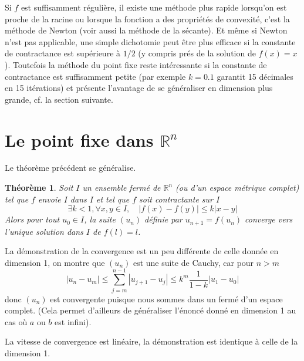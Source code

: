 \documentclass[a4paper,11pt]{book}
\newtheorem{thm}{Théorème}
\begin{document}
\begin{giacjshere}
Si $f$ est suffisamment r\'eguli\`ere,
il existe une méthode plus rapide lorsqu'on est proche de la racine ou lorsque
la fonction a des propriétés de convexité, c'est la méthode de Newton
(voir aussi la m\'ethode de la s\'ecante).
Et m\^eme si Newton n'est pas applicable, une simple dichotomie
peut \^etre plus efficace si la constante de contractance est 
sup\'erieure \`a $1/2$ (y compris pr\'es de la solution de $f(x)=x$).
Toutefois la m\'ethode du point fixe reste int\'eressante si la
constante de contractance est suffisamment petite (par exemple $k=0.1$
garantit 15 d\'ecimales en 15 it\'erations) et pr\'esente l'avantage
de se g\'en\'eraliser en dimension plus grande, cf. la section suivante.

\section{Le point fixe dans $\mathbb{R}^n$}
Le th\'eor\`eme pr\'ec\'edent se g\'en\'eralise. 
\begin{thm}
Soit $I$ un ensemble
ferm\'e de $\mathbb{R}^n$ (ou d'un espace m\'etrique complet) tel que $f$ 
envoie $I$ dans $I$ et tel que $f$ soit contractante sur $I$
$$ \exists k<1, \forall x,y \in I, \quad |f(x)-f(y)| \leq k |x-y|$$
Alors pour tout $u_0 \in I$, la suite $(u_n)$ d\'efinie par
$u_{n+1}=f(u_n)$ converge vers l'unique solution dans $I$ de $f(l)=l$.
\end{thm}
La d\'emonstration de la convergence est un peu diff\'erente de celle 
donn\'ee en
dimension 1, on montre que $(u_n)$ est une suite de Cauchy, car pour $n>m$
$$ |u_n-u_m| \leq \sum_{j=m}^{n-1}|u_{j+1}-u_j | 
\leq k^m \frac{1}{1-k} |u_1-u_0| $$
donc $(u_n)$ est convergente puisque nous sommes dans un ferm\'e 
d'un espace complet. (Cela permet d'ailleurs de g\'en\'eraliser 
l'\'enonc\'e donn\'e en dimension 1 au cas o\`u $a$ ou $b$ est infini).

La vitesse de convergence est lin\'eaire, la d\'emonstration est
identique \`a celle de la dimension 1.


\end{giacjshere}
\end{document}

